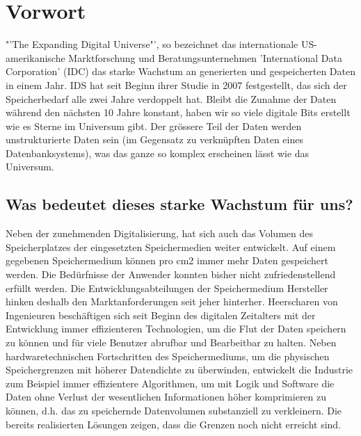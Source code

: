 
\cleardoublepage
\chapter{Vorwort}
"'The Expanding Digital Universe"', so bezeichnet das internationale US-amerikanische Marktforschung und Beratungsunternehmen 'International Data Corporation' (IDC) das starke Wachstum an generierten und gespeicherten Daten in einem Jahr. IDS hat seit Beginn ihrer Studie in 2007 festgestellt, das sich der Speicherbedarf alle zwei Jahre verdoppelt hat. Bleibt die Zunahme der Daten während den nächsten 10 Jahre konstant, haben wir so viele digitale Bits erstellt wie es Sterne im Universum gibt. Der grössere Teil der Daten werden unstrukturierte Daten sein (im Gegensatz zu verknüpften Daten eines Datenbanksystems), was das ganze so komplex erscheinen lässt wie das Universum. \cite{Gantz2011}

\section{Was bedeutet dieses starke Wachstum für uns?}
Neben der zunehmenden Digitalisierung, hat sich auch das Volumen des Speicherplatzes der eingesetzten Speichermedien weiter entwickelt. Auf einem gegebenen Speichermedium können pro cm2 immer mehr Daten gespeichert werden. Die Bedürfnisse der Anwender konnten bisher nicht zufriedenstellend erfüllt werden. Die Entwicklungsabteilungen der Speichermedium Hersteller hinken deshalb den Marktanforderungen seit jeher hinterher. Heerscharen von Ingenieuren beschäftigen sich seit Beginn des digitalen Zeitalters mit der Entwicklung immer effizienteren Technologien, um die Flut der Daten speichern zu können und für viele Benutzer abrufbar und Bearbeitbar zu halten. Neben hardwaretechnischen Fortschritten des Speichermediums, um die physischen Speichergrenzen mit höherer Datendichte zu überwinden, entwickelt die Industrie zum Beispiel immer effizientere Algorithmen, um mit Logik und Software die Daten ohne Verlust der wesentlichen Informationen höher komprimieren zu können, d.h. das zu speichernde Datenvolumen substanziell zu verkleinern. Die bereits realisierten Lösungen zeigen, dass die Grenzen noch nicht erreicht sind.

